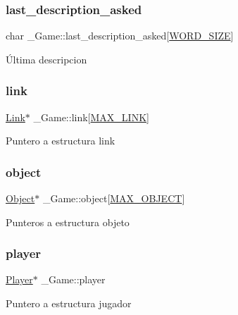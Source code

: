 \subsubsection{\texorpdfstring{last\+\_\+description\+\_\+asked}{last\_description\_asked}}
{\footnotesize\ttfamily char \+\_\+\+Game\+::last\+\_\+description\+\_\+asked\mbox{[}\hyperlink{types_8h_a92ed8507d1cd2331ad09275c5c4c1c89}{W\+O\+R\+D\+\_\+\+S\+I\+ZE}\mbox{]}}

Última descripcion \mbox{\label{struct__Game_acde062499c7180ecaf3bd36ba64385c6}} 
\subsubsection{\texorpdfstring{link}{link}}
{\footnotesize\ttfamily \hyperlink{link_8h_ae3b299941e67be6971bfd64a25505eff}{Link}$\ast$ \+\_\+\+Game\+::link\mbox{[}\hyperlink{game_8h_abfa744c8ca5b46f7f2a10aea53a4ec59}{M\+A\+X\+\_\+\+L\+I\+NK}\mbox{]}}

Puntero a estructura link \mbox{\label{struct__Game_a8ade6d831e4710c40b0d61004bbd1585}} 
\subsubsection{\texorpdfstring{object}{object}}
{\footnotesize\ttfamily \hyperlink{object_8h_a7f8bbcda919b65ce67f92fba08e0212f}{Object}$\ast$ \+\_\+\+Game\+::object\mbox{[}\hyperlink{game_8h_a7083b26c57d956d72197b9428d8e4894}{M\+A\+X\+\_\+\+O\+B\+J\+E\+CT}\mbox{]}}

Punteros a estructura objeto \mbox{\label{struct__Game_a31406605782d71ec00c4bf258ea76267}} 
\subsubsection{\texorpdfstring{player}{player}}
{\footnotesize\ttfamily \hyperlink{player_8h_af30e2030635a69690f85e48bc6ef202f}{Player}$\ast$ \+\_\+\+Game\+::player}

Puntero a estructura jugador \mbox{\label{struct__Game_a950475fd323cc097a94b0d67bdad3303}} 
